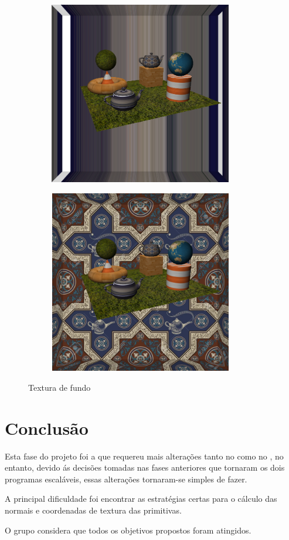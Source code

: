 \documentclass[11pt,a4paper]{report}
\begin{document}
\vspace{1cm}
\begin{figure}[H]
\centering
\begin{subfigure}{0.5\textwidth}
  \centering
  \includegraphics[width = 8cm,height = 8cm]{background_1.png}
  \caption{\texttt{}}
  \label{fig:background_1}
\end{subfigure}%
\begin{subfigure}{0.5\textwidth}
  \centering
  \includegraphics[width = 8cm,height = 8cm]{background_2.png}
  \caption{\texttt{}}
  \label{fig:background_2}
\end{subfigure}
\label{fig:texturas}
\caption{Textura de fundo}
\end{figure}




\newpage
\chapter{Conclusão}
Esta fase do projeto foi a que requereu mais alterações tanto no  como no , no entanto, devido ás decisões tomadas nas fases anteriores que tornaram os dois programas escaláveis, essas alterações tornaram-se simples de fazer. 

A principal dificuldade foi encontrar as estratégias certas para o cálculo das normais e coordenadas de textura das primitivas.

O grupo considera que todos os objetivos propostos foram atingidos.
\end{document}
